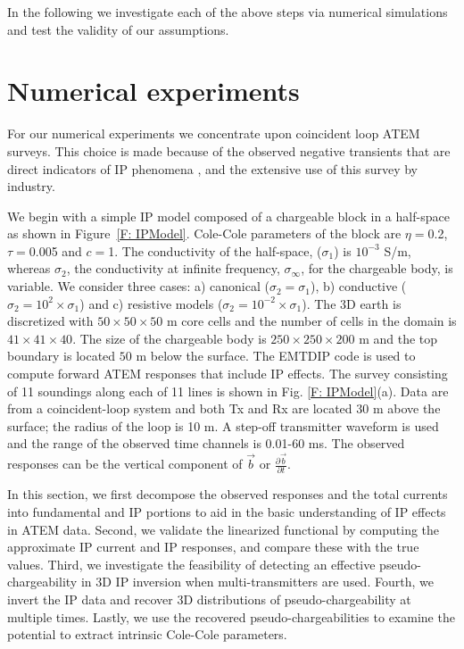 \documentclass[extra,mreferee]{gji}
\newcommand{\siginf}{\sigma_\infty}
\renewcommand {\b}  { {\vec b} }
\begin{document}
In the following we investigate each of the above steps via numerical simulations and test the validity of our assumptions. 


\section{Numerical experiments}
\label{section: numerical_examples}
For our numerical experiments we concentrate upon coincident loop ATEM surveys. This choice is made because of the observed negative transients that are direct indicators of IP phenomena \cite[]{Kratzer2012,Kang2015a,Kang2015b}, and the extensive  use of this survey  by industry.  

We begin with a simple IP model composed of  a chargeable block in a half-space as shown in Figure~\ref{F: IPModel}.
Cole-Cole parameters of  the block are  $\eta=$0.2, $\tau=$0.005 and $c=$1.
The conductivity  of the half-space, ($\sigma_1$) is  $10^{-3}$ S/m, whereas $\sigma_2$, 
the conductivity at infinite frequency, $\siginf$,  for the chargeable body, is variable.  
We consider three cases: a) canonical ($\sigma_2=\sigma_1$), b) conductive ($\sigma_2=10^2\times\sigma_1$) and c) resistive models ($\sigma_2=10^{-2}\times\sigma_1$).
The 3D earth is discretized with  $50\times50\times50$ m core cells and the number of cells in the domain is $41\times41\times40$.
The size of the chargeable body is $250\times250\times200$ m and the top boundary is located  $50$ m below the surface.
The EMTDIP code \cite[]{Marchant2014} is used to compute forward ATEM responses that include IP effects. The survey consisting of 11 soundings along each of 11 lines is shown in Fig. \ref{F: IPModel}(a).
Data are from a  coincident-loop system and both Tx and Rx are located 30 m above the surface; the radius of the loop is 10 m.
A step-off transmitter waveform is used and the range of the observed time channels is 0.01-60 ms. The observed responses can be the vertical component of $\b$ or $\frac{\partial \b}{\partial t}$.

In this section, we first decompose the observed responses and the total currents into fundamental and IP portions to aid in the basic understanding of IP effects in ATEM data. 
Second, we validate the linearized functional by computing the approximate IP current and IP responses, and compare these  with the true values. 
Third, we investigate the feasibility of detecting an effective pseudo-chargeability in 3D IP inversion when multi-transmitters are used. 
Fourth, we invert the IP data and recover 3D distributions of pseudo-chargeability at multiple times.  Lastly, we use the recovered pseudo-chargeabilities to examine the potential to extract intrinsic Cole-Cole parameters. 
\end{document}
